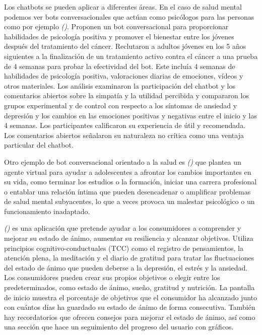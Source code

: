 {{{Los chatbots se pueden aplicar a diferentes áreas. En el caso de salud mental podemos ver bots conversacionales que actúan como psicólogos para las personas como por ejemplo \textit{(\cite{vivibot2019})}. Proponen un bot conversacional para proporcionar habilidades de psicología positiva y promover el bienestar entre los jóvenes después del tratamiento del cáncer. Reclutaron a adultos jóvenes en los 5 años siguientes a la finalización de un tratamiento activo contra el cáncer a una prueba de 4 semanas para probar la efectividad del bot. Este incluía 4 semanas de habilidades de psicología positiva, valoraciones diarias de emociones, vídeos y otros materiales. Los análisis examinaron la participación del chatbot y los comentarios abiertos sobre la simpatía y la utilidad percibida y compararon los grupos experimental y de control con respecto a los síntomas de ansiedad y depresión y los cambios en las emociones positivas y negativas entre el inicio y las 4 semanas. Los participantes calificaron su experiencia de útil y recomendada. Los comentarios abiertos señalaron su naturaleza no crítica como una ventaja particular del chatbot.{\vspace{0.3cm}

Otro ejemplo de bot conversacional orientado a la salud es \textit{(\cite{21daystressdetox2021})} que plantea un agente virtual para ayudar a adolescentes a afrontar los cambios importantes en su vida, como terminar los estudios o la formación, iniciar una carrera profesional o entablar una relación íntima que pueden desencadenar o amplificar problemas de salud mental subyacentes, lo que a veces provoca un malestar psicológico o un funcionamiento inadaptado. {\vspace{0.3cm}

\textit{(\cite{moodfit2016})} es una aplicación que pretende ayudar a los consumidores a comprender y mejorar su estado de ánimo, aumentar su resiliencia y alcanzar objetivos. Utiliza principios cognitivo-conductuales (TCC) como el registro de pensamientos, la atención plena, la meditación y el diario de gratitud para tratar las fluctuaciones del estado de ánimo que pueden deberse a la depresión, el estrés y la ansiedad. Los consumidores pueden crear sus propios objetivos o elegir entre los predeterminados, como estado de ánimo, sueño, gratitud y nutrición. La pantalla de inicio muestra el porcentaje de objetivos que el consumidor ha alcanzado junto con cuántos días ha guardado su estado de ánimo de forma consecutiva. También hay recordatorios que ofrecen consejos para mejorar el estado de ánimo, así como una sección que hace un seguimiento del progreso del usuario con gráficos.


}}}}}
